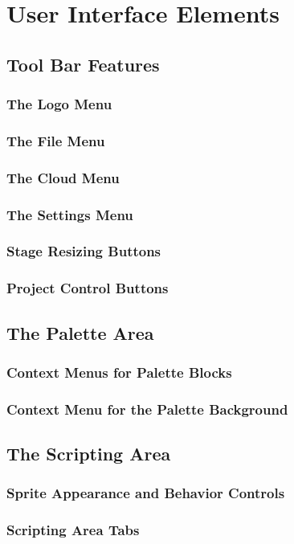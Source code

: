 \documentclass[a4paper]{report}
\begin{document}
\chapter{User Interface Elements}
\section{Tool Bar Features}
\subsection{The \Snap{} Logo Menu}
\subsection{The File Menu}
\subsection{The Cloud Menu}
\subsection{The Settings Menu}
\subsection{Stage Resizing Buttons}
\subsection{Project Control Buttons}
\section{The Palette Area}
\subsection{Context Menus for Palette Blocks}
\subsection{Context Menu for the Palette Background}
\section{The Scripting Area}
\subsection{Sprite Appearance and Behavior Controls}
\subsection{Scripting Area Tabs}
\end{document}

